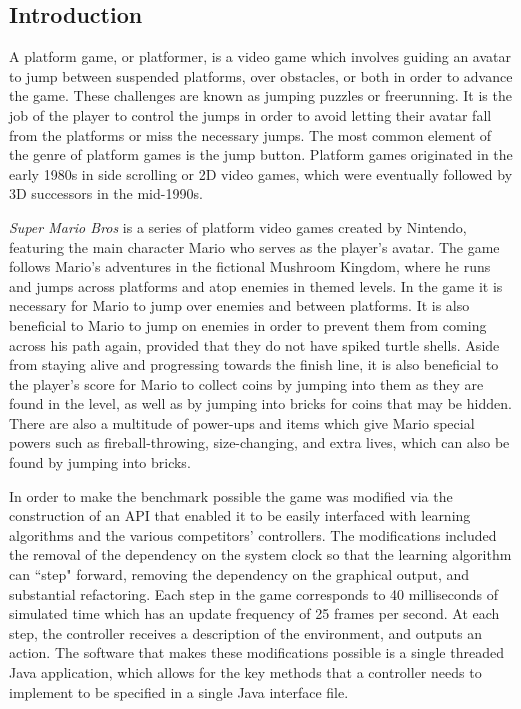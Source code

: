 \documentclass[12pt]{article}
\begin{document}
\setlength{\columnsep}{.65cm}
\begin{multicols}{2}
\section * {Introduction}
A platform game, or platformer, is a video game which involves guiding an avatar to jump between suspended 
platforms, over obstacles, or both in order to advance the game. These challenges are known as jumping puzzles 
or freerunning. It is the job of the player to control the jumps in order to avoid letting their avatar fall from the 
platforms or miss the necessary jumps. The most common element of the genre of platform games is the jump 
button. Platform games originated in the early 1980s in side scrolling or 2D video games, which were eventually 
followed by 3D successors in the mid-1990s.

\textit {Super Mario Bros} is a series of platform video games created by Nintendo, featuring the main character Mario who 
serves as the player's avatar. The game follows Mario's adventures in the fictional Mushroom Kingdom, where he 
runs and jumps across platforms and atop enemies in themed levels. In the game it is necessary for Mario to jump 
over enemies and between platforms. It is also beneficial to Mario to jump on enemies in order to prevent them 
from coming across his path again, provided that they do not have spiked turtle shells. Aside from staying alive and 
progressing towards the finish line, it is also beneficial to the player's score for Mario to collect coins by jumping 
into them as they are found in the level, as well as by jumping into bricks for coins that may be hidden. There are 
also a multitude of power-ups and items which give Mario special powers such as fireball-throwing, size-changing, 
and extra lives, which can also be found by jumping into bricks.

In order to make the benchmark possible the game was modified via the construction of an API that enabled it to be 
easily interfaced with learning algorithms and the various competitors' controllers. The modifications included the 
removal of the dependency on the system clock so that the learning algorithm can ``step" forward, removing the 
dependency on the graphical output, and substantial refactoring. Each step in the game corresponds to 40 
milliseconds of simulated time which has an update frequency of 25 frames per second. At each step, the controller 
receives a description of the environment, and outputs an action. The software that makes these modifications 
possible is a single threaded Java application, which allows for the key methods that a controller needs to 
implement to be specified in a single Java interface file.


\end{multicols}
\end{document}

